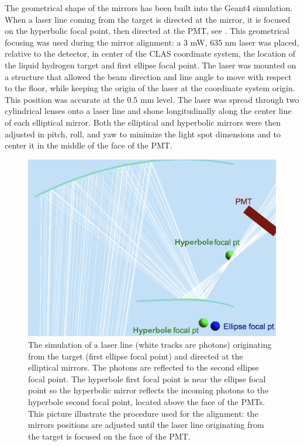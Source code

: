 The geometrical shape of the mirrors has been built into the Geant4 simulation. When a laser line coming from the target is directed at the mirror,
it is focused on the hyperbolic focal point, then directed at the PMT, see .
This geometrical focusing was used during the mirror alignment: a 3 mW, 635 nm laser was placed, relative to the detector,
in center of the CLAS coordinate system, the location of the liquid hydrogen target and first ellipse focal point.
The laser was mounted on a structure that allowed the beam direction and line angle to move with respect to the floor, while keeping
the origin of the laser at the coordinate system origin.
This position was accurate at the 0.5 mm level. The laser was spread through two cylindrical lenses onto a laser line and shone
longitudinally along the center line of each elliptical mirror. Both the elliptical and hyperbolic mirrors were then adjusted in pitch, roll, and yaw to minimize the light spot
dimensions and to center it in the middle of the face of the PMT.


\begin{figure}
\centering
	\includegraphics[width=0.99\columnwidth,  height=0.75\columnwidth]{img/mirrorAlignmentSimulationZoomed.png}
	\caption{The simulation of a laser line (white tracks are photons) originating from the target (first ellipse focal point) and directed at the elliptical mirrors.
            The photons are reflected to the second ellipse focal point. The hyperbole first focal point is near the ellipse focal point so the hyperbolic mirror
			   reflects the incoming photons to the hyperbole second focal point, located above the face of the PMTs.
			   This picture illustrate the procedure used for the alignment: the mirrors positions are adjusted until the laser line originating from
				the target is focused on the face of the PMT.}
	\label{fig:alignmentSimulation}
\end{figure}


